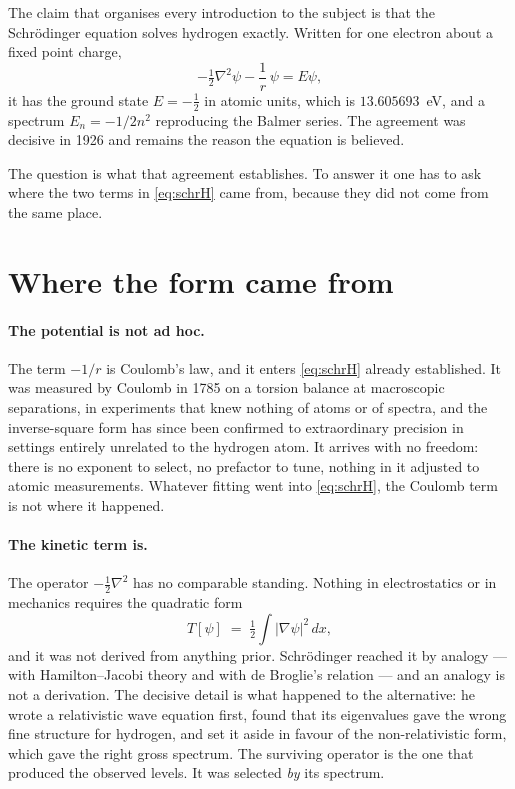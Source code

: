 \documentclass[11pt]{article}
\begin{document}
The claim that organises every introduction to the subject is that the Schr\"odinger equation
solves hydrogen exactly. Written for one electron about a fixed point charge,
\begin{equation}
-\tfrac12\nabla^2\psi - \frac{1}{r}\,\psi = E\psi,
\label{eq:schrH}
\end{equation}
it has the ground state $E = -\tfrac12$ in atomic units, which is $13.605693$~eV, and a spectrum
$E_n = -1/2n^2$ reproducing the Balmer series. The agreement was decisive in 1926 and remains the
reason the equation is believed.

The question is what that agreement establishes. To answer it one has to ask where the two terms
in \eqref{eq:schrH} came from, because they did not come from the same place.

\section{Where the form came from}\label{sec:form}

\paragraph{The potential is not ad hoc.}
The term $-1/r$ is Coulomb's law, and it enters \eqref{eq:schrH} already established. It was
measured by Coulomb in 1785 on a torsion balance at macroscopic separations, in experiments that
knew nothing of atoms or of spectra, and the inverse-square form has since been confirmed to
extraordinary precision in settings entirely unrelated to the hydrogen atom. It arrives with no
freedom: there is no exponent to select, no prefactor to tune, nothing in it adjusted to atomic
measurements. Whatever fitting went into \eqref{eq:schrH}, the Coulomb term is not where it
happened.

\paragraph{The kinetic term is.}
The operator $-\tfrac12\nabla^2$ has no comparable standing. Nothing in electrostatics or in
mechanics requires the quadratic form
\begin{equation}
T[\psi] \;=\; \tfrac12\int |\nabla\psi|^2\,dx ,
\label{eq:kinetic}
\end{equation}
and it was not derived from anything prior. Schr\"odinger reached it by analogy --- with
Hamilton--Jacobi theory and with de Broglie's relation --- and an analogy is not a derivation. The
decisive detail is what happened to the alternative: he wrote a relativistic wave equation first,
found that its eigenvalues gave the wrong fine structure for hydrogen, and set it aside in favour
of the non-relativistic form, which gave the right gross spectrum. The surviving operator is the
one that produced the observed levels. It was selected \emph{by} its spectrum.
\end{document}
